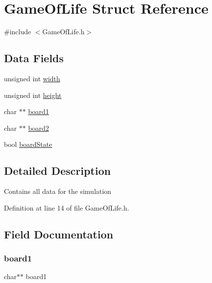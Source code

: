 \hypertarget{struct_game_of_life}{}\section{Game\+Of\+Life Struct Reference}
\label{struct_game_of_life}


{\ttfamily \#include $<$Game\+Of\+Life.\+h$>$}

\subsection*{Data Fields}
\begin{DoxyCompactItemize}
\item 
unsigned int \mbox{\hyperlink{struct_game_of_life_aca34d28e3d8bcbcadb8edb4e3af24f8c}{width}}
\item 
unsigned int \mbox{\hyperlink{struct_game_of_life_ab2e78c61905b4419fcc7b4cfc500fe85}{height}}
\item 
char $\ast$$\ast$ \mbox{\hyperlink{struct_game_of_life_aa71ad83d3601163b9867d0e8d61554c0}{board1}}
\item 
char $\ast$$\ast$ \mbox{\hyperlink{struct_game_of_life_a8d9c8d8284d6bd2ee13d4ab4b23cf7e6}{board2}}
\item 
bool \mbox{\hyperlink{struct_game_of_life_ab8eb1dbd4349bf43a07546844e26c678}{board\+State}}
\end{DoxyCompactItemize}


\subsection{Detailed Description}
Contains all data for the simulation 

Definition at line 14 of file Game\+Of\+Life.\+h.



\subsection{Field Documentation}
\mbox{\label{struct_game_of_life_aa71ad83d3601163b9867d0e8d61554c0}} 
\subsubsection{\texorpdfstring{board1}{board1}}
{\footnotesize\ttfamily char$\ast$$\ast$ board1}

